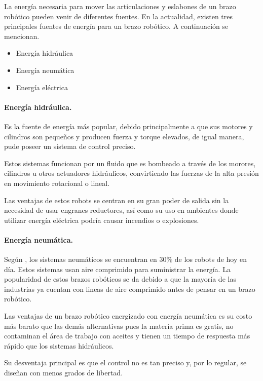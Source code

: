 La energía necesaria para mover las articulaciones y eslabones de un brazo robótico pueden venir de diferentes fuentes. En la actualidad, existen tres principales fuentes de energía para un brazo robótico. A continuación se mencionan.

\begin{itemize}
\itemsep0em
\item Energía hidráulica
\item Energía neumática
\item Energía eléctrica
\end{itemize}

\paragraph{Energía hidráulica.} Es la fuente de energía más popular, debido principalmente a que sus motores y cilindros son pequeños y producen fuerza y torque elevados, de igual manera, pude poseer un sistema de control preciso. 

Estos sistemas funcionan por un fluido que es  bombeado a través de los morores, cilindros u otros actuadores hidráulicos, convirtiendo las fuerzas de la alta presión en movimiento rotacional o lineal.

Las ventajas de estos robots se centran en su gran poder de salida sin la necesidad de usar engranes reductores, así como su uso en ambientes donde utilizar energía eléctrica podría causar incendios o explosiones. 

\paragraph{Energía neumática.}  Según \cite{Craig2013}, los sistemas neumáticos se encuentran en 30\% de los robots de hoy en día. Estos sistemas usan aire comprimido para suministrar la energía. La popularidad de estos brazos robóticos se da debido a que la mayoría de las industrias ya cuentan con lineas de aire comprimido antes de pensar en un brazo robótico.

Las ventajas de un brazo robótico energizado con energía neumática es su costo más barato que las demás alternativas pues la matería prima es gratis, no contaminan el área de trabajo con aceites y tienen un tiempo de respuesta más rápido que los sistemas hidráulicos.

Su desventaja principal es que el control no es tan preciso y, por lo regular, se diseñan con menos grados de libertad. 

